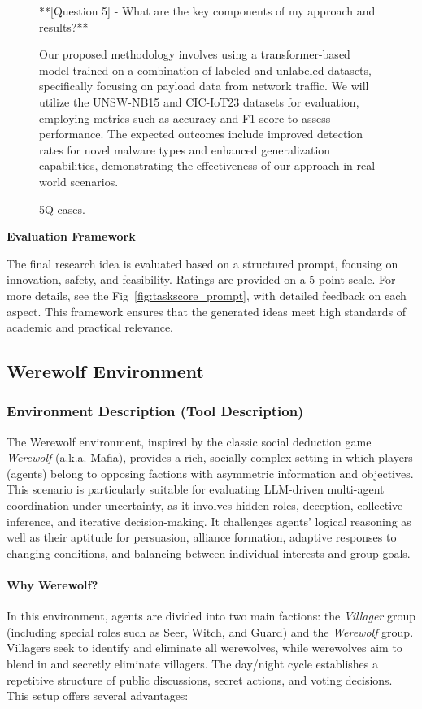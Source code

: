 \begin{figure}[htbp]
\begin{tcolorbox}[colback=green!2!white, colframe=gray!50!green]
\begin{minipage}{\linewidth}
**[Question 5] - What are the key components of my approach and results?**

Our proposed methodology involves using a transformer-based model trained on a combination of labeled and unlabeled datasets, specifically focusing on payload data from network traffic. We will utilize the UNSW-NB15 and CIC-IoT23 datasets for evaluation, employing metrics such as accuracy and F1-score to assess performance. The expected outcomes include improved detection rates for novel malware types and enhanced generalization capabilities, demonstrating the effectiveness of our approach in real-world scenarios.
\end{minipage}
\end{tcolorbox}
\caption{5Q cases.}
\label{fig:generated-research-idea-case}
\end{figure}

\textbf{Evaluation Framework}

The final research idea is evaluated based on a structured prompt, focusing on innovation, safety, and feasibility. Ratings are provided on a 5-point scale. For more details, see the Fig~\ref{fig:taskscore_prompt}, with detailed feedback on each aspect. This framework ensures that the generated ideas meet high standards of academic and practical relevance.


\subsection{Werewolf Environment}
\label{app:werewolf_env}

\subsubsection{Environment Description (Tool Description)}

The Werewolf environment, inspired by the classic social deduction game \emph{Werewolf} (a.k.a. Mafia), provides a rich, socially complex setting in which players (agents) belong to opposing factions with asymmetric information and objectives. This scenario is particularly suitable for evaluating LLM-driven multi-agent coordination under uncertainty, as it involves hidden roles, deception, collective inference, and iterative decision-making. It challenges agents’ logical reasoning as well as their aptitude for persuasion, alliance formation, adaptive responses to changing conditions, and balancing between individual interests and group goals.

\paragraph{Why Werewolf?}
In this environment, agents are divided into two main factions: the \emph{Villager} group (including special roles such as Seer, Witch, and Guard) and the \emph{Werewolf} group. Villagers seek to identify and eliminate all werewolves, while werewolves aim to blend in and secretly eliminate villagers. The day/night cycle establishes a repetitive structure of public discussions, secret actions, and voting decisions. This setup offers several advantages:

